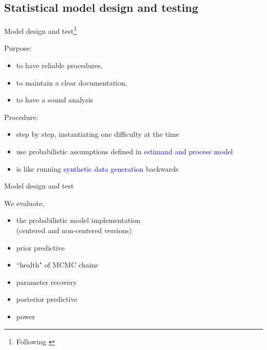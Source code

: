 \subsection{Statistical model design and testing}
%
%
\begin{frame}[t, negative]
	\subsectionpage
\end{frame}
%
%
\begin{lhframe}[rhgraphic={\texttt{[image: tide\_machine.jpg]}}]
	{Model design and test\footnote{Following \citet{Fogarty_et_al_2022}}}
	
	Purpose:
	\begin{itemize}
		\item to have reliable procedures,
		\item to maintain a clear documentation,
		\item to have a sound analysis
	\end{itemize}
	
	Procedure:
	\begin{itemize}
		\item step by step, instantiating one difficulty at the time
		\item use probabilistic assumptions defined in \textcolor{blue}{estimand and process model}
		\item is like running \textcolor{blue}{synthetic data generation} backwards
	\end{itemize}
\end{lhframe}
%
%
\begin{lhframe}[rhgraphic={\texttt{[image: tide\_machine.jpg]}}]
	{Model design and test}
	
	We evaluate,
	\begin{itemize}
		\item the probabilistic model implementation \cite{McElreath_2020, Betancourt_et_al_2013} \\
		{\small (centered and non-centered versions) }
		\item prior predictive
		\item ``health" of MCMC chains
		\item parameter recovery
		\item posterior predictive
		\item power
	\end{itemize}
\end{lhframe}
%
